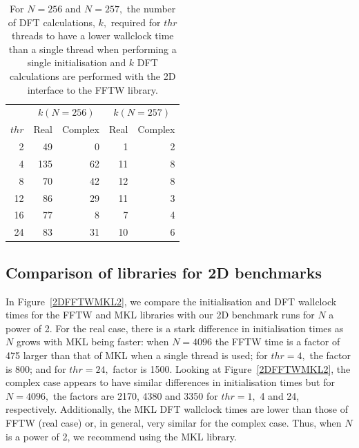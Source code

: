 \documentclass[a4paper]{article}
\begin{document}
\begin{table}
\begin{center}
\begin{tabular}{|r||r|r||r|r|}
  \hline
 & \multicolumn{2}{|c||}{$k(N=256)$} & \multicolumn{2}{|c|}{$k(N=257)$} \\
$thr$ &  Real & Complex &  Real & Complex  \\ \hline
  2 & 49 & 0   &  1 & 2 \\
  4 & 135 & 62 & 11 & 8 \\
  8 & 70 & 42 & 12 & 8 \\
  12 & 86 & 29 & 11 & 3 \\
  16 & 77 & 8  & 7 & 4 \\
  24 & 83 & 31 &10 & 6  \\ \hline
\end{tabular}
\caption{ For $N=256$ and $N=257,$ the number of DFT calculations, $k,$ required for $thr$ threads to have a lower wallclock time than a single thread when performing  a single initialisation and $k$ DFT calculations are performed with the 2D interface to the FFTW library.  }\label{TblMKL2dk}
\end{center}
\end{table}

\subsection{Comparison of libraries for 2D benchmarks}\label{Sec:2DComp}

In Figure~\ref{2DFFTWMKL2}, we compare the initialisation and DFT
wallclock times for the FFTW and MKL libraries with our 2D benchmark
runs for $N$ a power of 2. For the real case, there is a stark
difference in initialisation times as $N$ grows with MKL being faster:
when $N=4096$ the FFTW time is a factor of 475 larger than that of MKL
when a single thread is used; for $thr=4,$ the factor is 800; and for
$thr=24,$ factor is 1500. Looking at Figure~\ref{2DFFTWMKL2}, the
complex case appears to have similar differences in initialisation
times but for $N=4096,$ the factors are 2170, 4380 and 3350 for
$thr=1,$ 4 and 24, respectively. Additionally, the MKL DFT wallclock
times are lower than those of FFTW (real case) or, in general, very
similar for the complex case. Thus, when $N$ is a power of 2, we
recommend using the MKL library.
\end{document}
